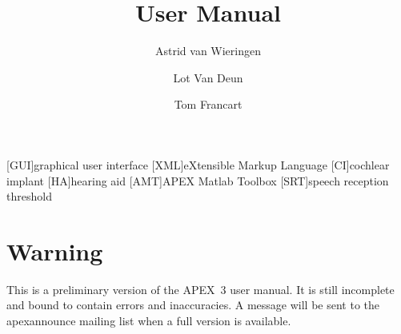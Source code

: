 \documentclass[a4paper,12pt,table]{book}
\title{\apex User Manual}
\author{Astrid van Wieringen \and Lot Van Deun \and Tom Francart}
\newcommand{\incomplete}[1]{#1}
\newcommand{\apex}{APEX~3\xspace}
\begin{document}
\begin{acronym}
[GUI]{graphical user interface}
[XML]{eXtensible Markup Language}
[CI]{cochlear implant}
[HA]{hearing aid}
[AMT]{APEX Matlab Toolbox}
[SRT]{speech reception threshold}
\end{acronym}



\maketitle


\section*{Warning}

This is a preliminary version of the \apex user manual. It is still incomplete and bound to contain errors and inaccuracies. A message will be sent to the apexannounce mailing list when a full version is available.


\newpage


\tableofcontents







\incomplete{}



\appendix

\incomplete{}          %
\incomplete{}
\incomplete{}
\incomplete{}




\printindex
\end{document}
